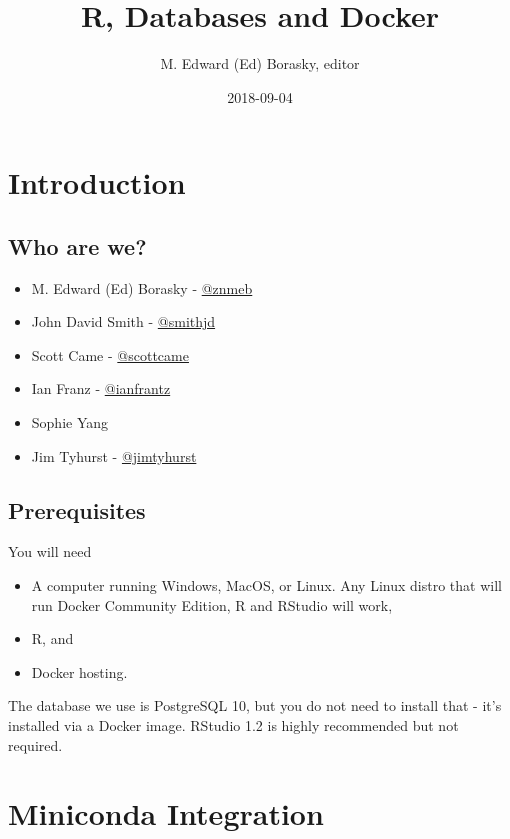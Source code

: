 \documentclass[]{book}
\title{R, Databases and Docker}
\author{M. Edward (Ed) Borasky, editor}
\date{2018-09-04}
\providecommand{\tightlist}{%
  \setlength{\itemsep}{0pt}\setlength{\parskip}{0pt}}
\theoremstyle{definition}
\theoremstyle{definition}
\theoremstyle{definition}
\theoremstyle{remark}
\begin{document}
\maketitle

{
\setcounter{tocdepth}{1}
\tableofcontents
}
\hypertarget{introduction}{%
\chapter{Introduction}\label{introduction}}

\hypertarget{who-are-we}{%
\section{Who are we?}\label{who-are-we}}

\begin{itemize}
\tightlist
\item
  M. Edward (Ed) Borasky - \href{https://github.com/znmeb}{@znmeb}
\item
  John David Smith - \href{https://github.com/smithjd}{@smithjd}
\item
  Scott Came - \href{https://github.com/scottcame}{@scottcame}
\item
  Ian Franz - \href{https://github.com/ianfrantz}{@ianfrantz}
\item
  Sophie Yang
\item
  Jim Tyhurst - \href{https://github.com/jimtyhurst}{@jimtyhurst}
\end{itemize}

\hypertarget{prerequisites}{%
\section{Prerequisites}\label{prerequisites}}

You will need

\begin{itemize}
\tightlist
\item
  A computer running Windows, MacOS, or Linux. Any Linux distro that
  will run Docker Community Edition, R and RStudio will work,
\item
  R, and
\item
  Docker hosting.
\end{itemize}

The database we use is PostgreSQL 10, but you do not need to install
that - it's installed via a Docker image. RStudio 1.2 is highly
recommended but not required.

\hypertarget{miniconda-integration}{%
\chapter{Miniconda Integration}\label{miniconda-integration}}
\end{document}
